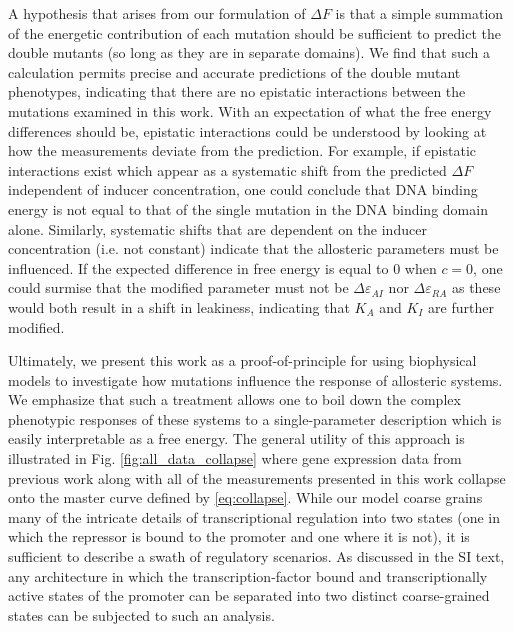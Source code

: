 A hypothesis that arises from our formulation of $\Delta F$ is that a
simple summation of the energetic contribution of each mutation should be
sufficient to predict the double mutants (so long as they are in separate
domains). We find that such a calculation permits precise and accurate
predictions of the double mutant phenotypes, indicating that there are no
epistatic interactions between the mutations examined in this work. With an
expectation of what the free energy differences should be, epistatic
interactions could be understood by looking at how the measurements deviate
from the prediction. For example, if epistatic interactions exist which
appear as a systematic shift from the predicted $\Delta F$ 
independent of inducer concentration, one could conclude that DNA binding
energy is not equal to that of the single mutation in the DNA binding domain alone. Similarly,
systematic shifts that are dependent on the inducer concentration (i.e. not
constant) indicate that the allosteric parameters must be influenced. If the
expected difference in free energy is equal to $0$ when $c=0$, one could
surmise that the modified parameter must not be $\Delta\varepsilon_{AI}$ nor
$\Delta\varepsilon_{RA}$ as these would both result in a shift in leakiness,
indicating that $K_A$ and $K_I$ are further modified.

Ultimately, we present this work as a proof-of-principle for using
biophysical models to investigate how mutations influence the response of
allosteric systems. We emphasize that such a treatment allows one to boil
down the complex phenotypic responses of these systems to a single-parameter
description which is easily interpretable as a free energy. The general
utility of this approach is illustrated in Fig. \ref{fig:all_data_collapse}
where gene expression data from previous work \cite{Garcia2011, Brewster2014,
Razo-Mejia2018} along with all of the measurements presented in this work
collapse onto the master curve defined by \eqref{eq:collapse}. While our
model coarse grains many of the intricate details of transcriptional
regulation into two states (one in which the repressor is bound to the
promoter and one where it is not), it is sufficient to describe a swath
of regulatory scenarios. As discussed in the SI text, any
architecture in which the transcription-factor bound and transcriptionally
active states of the promoter can be separated into two distinct coarse-grained
states can be subjected to such an analysis. 

